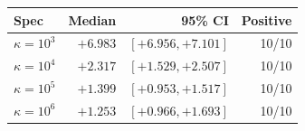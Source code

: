 \begin{tabular}{lrrr}
\toprule
Spec & Median & 95\% CI & Positive \\
\midrule
$\kappa = 10^{3}$ & $+6.983$ & $[+6.956, +7.101]$ & 10/10 \\
$\kappa = 10^{4}$ & $+2.317$ & $[+1.529, +2.507]$ & 10/10 \\
$\kappa = 10^{5}$ & $+1.399$ & $[+0.953, +1.517]$ & 10/10 \\
$\kappa = 10^{6}$ & $+1.253$ & $[+0.966, +1.693]$ & 10/10 \\
\bottomrule
\end{tabular}
